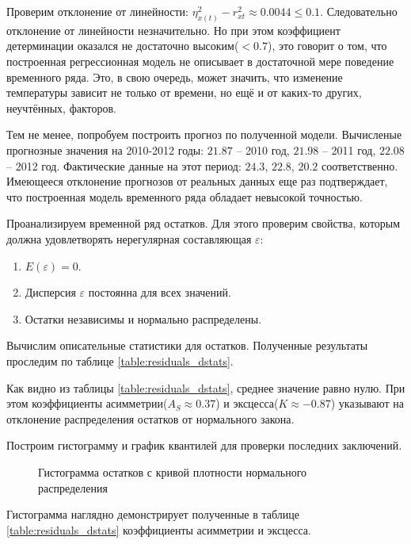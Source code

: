 Проверим отклонение от линейности: $\eta_{x(t)}^2 - r_{xt}^{2} \approx 0.0044 \le 0.1$. Следовательно отклонение от линейности незначительно. Но при этом коэффициент детерминации оказался не достаточно высоким($<0.7$), это говорит о том, что построенная регрессионная модель не описывает в достаточной мере поведение временного ряда. Это, в свою очередь, может значить, что изменение температуры зависит не только от времени, но ещё и от каких-то других, неучтённых, факторов.

Тем не менее, попробуем построить прогноз по полученной модели. Вычисленые прогнозные значения на 2010-2012 годы: $21.87$ – 2010 год, $21.98$ – 2011 год, $22.08$ – 2012 год. Фактические данные на этот период: $24.3$, $22.8$, $20.2$ соответственно. Имеющееся отклонение прогнозов от реальных данных еще раз подтверждает, что построенная модель временного ряда обладает невысокой точностью.

Проанализируем временной ряд остатков. Для этого проверим свойства, которым должна удовлетворять нерегулярная составляющая $\varepsilon$:
\begin{enumerate}
	\item $E(\varepsilon) = 0$.
	\item Дисперсия $\varepsilon$ постоянна для всех значений.
	\item Остатки независимы и нормально распределены.
\end{enumerate}
Вычислим описательные статистики для остатков. Полученные результаты проследим по таблице \ref{table:residuals_dstats}.


Как видно из таблицы \ref{table:residuals_dstats}, среднее значение равно нулю. При этом коэффициенты асимметрии($A_S \approx 0.37$) и эксцесса($K \approx -0.87$) указывают на отклонение распределения остатков от нормального закона.

Построим гистограмму и график квантилей для проверки последних заключений.
\begin{figure}[ht]
\caption{Гистограмма остатков с кривой плотности нормального распределения}
\label{img:resid_hist}
\end{figure}
Гистограмма наглядно демонстрирует полученные в таблице \ref{table:residuals_dstats} коэффициенты асимметрии и эксцесса.

